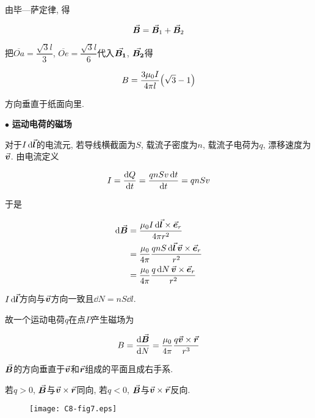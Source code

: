 \begin{example}
\begin{solution}
		由毕—萨定律, 得
		
		\begin{equation*}
			\va*{B} = \va*{B}_1 + \va*{B}_2
		\end{equation*}
		
		把$\overline{Oa} = \dfrac{\sqrt{3} l}{3}$, $\overline{Oe} = \dfrac{\sqrt{3} l}{6}$代入$\va*{B_1}$, $\va*{B_2}$得
		
		\begin{equation*}
			B = \dfrac{3 \mu_0 I}{4 \pi l} \qty(\sqrt{3} - 1)
		\end{equation*}
	
	    方向垂直于纸面向里. 
	
	\end{solution}
	
\end{example}

$\bullet$ \textbf{运动电荷的磁场}

对于$I\dd{\va*{l}}$的电流元, 若导线横截面为$S$, 载流子密度为$n$, 载流子电荷为$q$, 漂移速度为$\va*{v}$. 由电流定义

\begin{equation}
	I = \dv{Q}{t} = \dfrac{qnSv\dd{t}}{\dd{t}} = qnSv \label{C8-eq13}
\end{equation}

于是

\begin{align*}
	\dd{\va*{B}} &= \dfrac{\mu_0 I \dd{\va*{l}} \times \va*{e}_r}{4 \pi r^2} \\
	&= \dfrac{\mu_0}{4 \pi} \dfrac{qnS\dd{\va*{l}} \va*{v} \times \va*{e}_r}{r^2} \\
	&= \dfrac{\mu_0}{4 \pi} \dfrac{q\dd{N} \va*{v} \times \va*{e}_r}{r^2}
\end{align*}

$I\dd{\va*{l}}$方向与$\va*{v}$方向一致且$\dd{N} = nS\dd{l}$. 

故一个运动电荷$q$在点$P$产生磁场为

\begin{equation}
	B = \dv{\va*{B}}{N} = \dfrac{\mu_0}{4 \pi} \dfrac{q \va*{v} \times \va*{r}}{r^3} \label{C8-eq14}
\end{equation}

$\va*{B}$的方向垂直于$\va*{v}$和$\va*{r}$组成的平面且成右手系. 

若$q > 0$, $\va*{B}$与$\va*{v} \times \va*{r}$同向, 若$q < 0$, $\va*{B}$与$\va*{v} \times \va*{r}$反向. 

\begin{figure}[H]
	\centering
	\texttt{[image: C8-fig7.eps]}
\end{figure}

